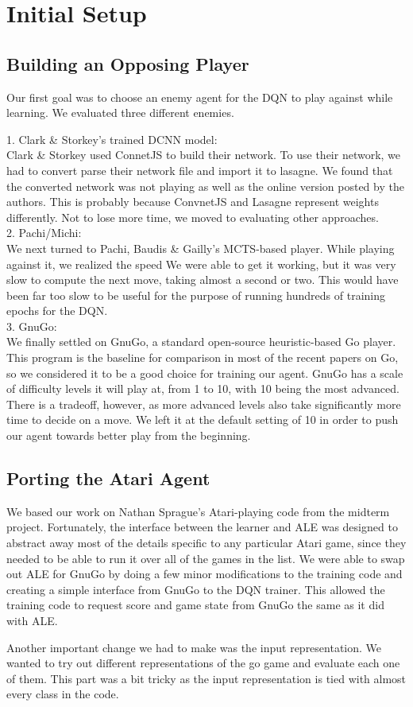 \section{Initial Setup}

\subsection*{Building an Opposing Player}

Our first goal was to choose an enemy agent for the DQN to play against while learning. We evaluated three different enemies.

1. Clark \& Storkey's trained DCNN model: \\

Clark \& Storkey used ConnetJS to build their network. To use their network, we had to convert parse their network file and import it to lasagne. We found that the converted network was not playing as well as the online version posted by the authors. This is probably because ConvnetJS and Lasagne represent weights differently. Not to lose more time, we moved to evaluating other approaches.
\\
2. Pachi/Michi: 
\\
We next turned to Pachi, Baudis \& Gailly's MCTS-based player. While playing against it, we realized the speed  We were able to get it working, but it was very slow to compute the next move, taking almost a second or two. This would have been far too slow to be useful for the purpose of running hundreds of training epochs for the DQN.
\\
3. GnuGo:
\\
We finally settled on GnuGo, a standard open-source heuristic-based Go player. This program is the baseline for comparison in most of the recent papers on Go, so we considered it to be a good choice for training our agent. GnuGo has a scale of difficulty levels it will play at, from 1 to 10, with 10 being the most advanced. There is a tradeoff, however, as more advanced levels also take significantly more time to decide on a move. We left it at the default setting of 10 in order to push our agent towards better play from the beginning.

\subsection*{Porting the Atari Agent}

We based our work on Nathan Sprague's Atari-playing code from the midterm project. Fortunately, the interface between the learner and ALE was designed to abstract away most of the details specific to any particular Atari game, since they needed to be able to run it over all of the games in the list. We were able to swap out ALE for GnuGo by doing a few minor modifications to the training code and creating a simple interface from GnuGo to the DQN trainer. This allowed the training code to request score and game state from GnuGo the same as it did with ALE.

Another important change we had to make was the input representation. We wanted to try out different representations of the go game and evaluate each one of them. This part was a bit tricky as the input representation is tied with almost every class in the code.